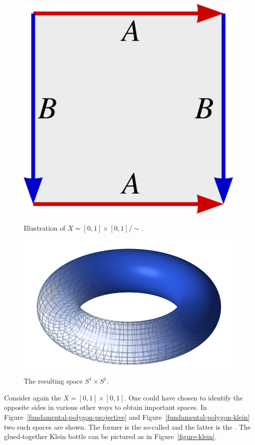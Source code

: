 \begin{figure}
\centering
\begin{minipage}{.5\textwidth}
  \centering
  \includegraphics[width=.4\linewidth]{images/fundamental-polygon-torus}
  \caption{Illustration of $X = [0,1] \times [0,1]/\sim$.}
  \label{fundamental-polygon-torus}
\end{minipage}%
\begin{minipage}{.5\textwidth}
  \centering
  \includegraphics[width=.5\linewidth]{images/figure-torus}
  \caption{The resulting space $S^1 \times S^1$.}
  \label{figure-torus}
\end{minipage}
\end{figure}
\begin{example}
  Consider again the $X = [0,1] \times [0,1]$. One could have chosen to identify the opposite sides in various other ways to obtain important spaces. In Figure~\ref{fundamental-polygon-projective} and Figure~\ref{fundamental-polygon-klein} two such spaces are shown. The former is the so-called  and the latter is the . The glued-together Klein bottle can be pictured as in Figure~\ref{figure-klein}.
\end{example}
